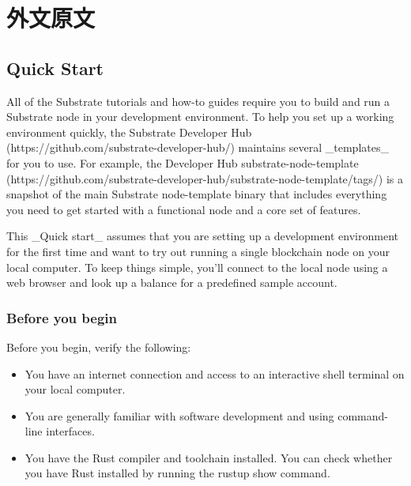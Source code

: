 %
%
%
%
%
%


\chapter{外文原文}

\section{Quick Start}

All of the Substrate tutorials and how-to guides require you to build and run a Substrate node in your development environment.
To help you set up a working environment quickly, the Substrate Developer Hub (https://github.com/substrate-developer-hub/) maintains several _templates_ for you to use.
For example, the Developer Hub substrate-node-template (https://github.com/substrate-developer-hub/substrate-node-template/tags/) is a snapshot of the main Substrate node-template binary that includes everything you need to get started with a functional node and a core set of features.

This _Quick start_ assumes that you are setting up a development environment for the first time and want to try out running a single blockchain node on your local computer.
To keep things simple, you'll connect to the local node using a web browser and look up a balance for a predefined sample account.

\subsection{Before you begin}


Before you begin, verify the following: 

\begin{itemize}
  \item You have an internet connection and access to an interactive shell terminal on your local computer.
  \item You are generally familiar with software development and using command-line interfaces.
  \item You have the Rust compiler and toolchain installed.
  You can check whether you have Rust installed by running the rustup show command.
\end{itemize}


